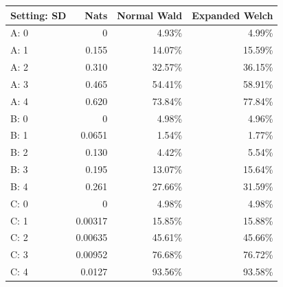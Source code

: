 \begin{tabular}{@{}lrrr@{}}
\toprule
Setting: SD & Nats & Normal Wald & Expanded Welch\\
\midrule
A: 0 & 0 & 4.93\% & 4.99\%\\
A: 1 & 0.155 & 14.07\% & 15.59\%\\
A: 2 & 0.310 & 32.57\% & 36.15\%\\
A: 3 & 0.465 & 54.41\% & 58.91\%\\
A: 4 & 0.620 & 73.84\% & 77.84\%\\
B: 0 & 0 & 4.98\% & 4.96\%\\
B: 1 & 0.0651 & 1.54\% & 1.77\%\\
B: 2 & 0.130 & 4.42\% & 5.54\%\\
B: 3 & 0.195 & 13.07\% & 15.64\%\\
B: 4 & 0.261 & 27.66\% & 31.59\%\\
C: 0 & 0 & 4.98\% & 4.98\%\\
C: 1 & 0.00317 & 15.85\% & 15.88\%\\
C: 2 & 0.00635 & 45.61\% & 45.66\%\\
C: 3 & 0.00952 & 76.68\% & 76.72\%\\
C: 4 & 0.0127 & 93.56\% & 93.58\%\\
\bottomrule
\end{tabular}
